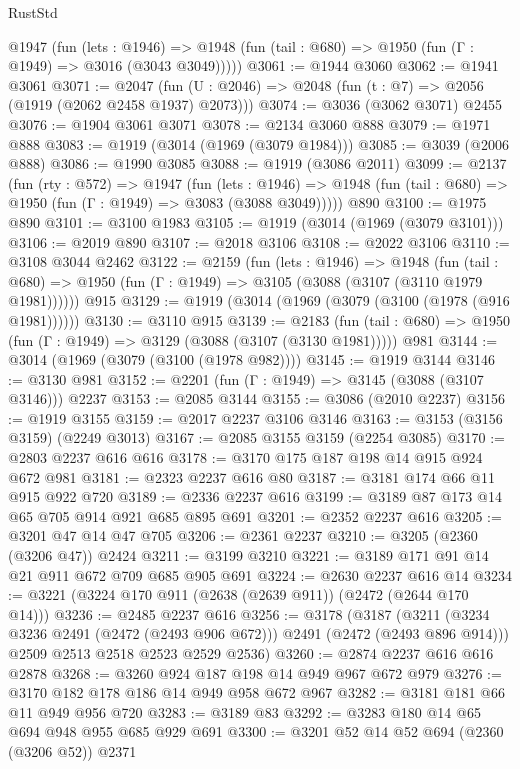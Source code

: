 \begin{lexlean}{RustStd}
\begin{coremodule}
    @1947
      (fun (lets : @1946) =>
      @1948 (fun (tail : @680) => @1950 (fun (Γ : @1949) => @3016 (@3043 @3049)))))
@3061 := @1944 @3060
@3062 := @1941 @3061
@3071 := @2047 (fun (U : @2046) => @2048 (fun (t : @7) => @2056 (@1919 (@2062 @2458 @1937) @2073)))
@3074 := @3036 (@3062 @3071) @2455
@3076 := @1904 @3061 @3071
@3078 := @2134 @3060 @888
@3079 := @1971 @888
@3083 := @1919 (@3014 (@1969 (@3079 @1984)))
@3085 := @3039 (@2006 @888)
@3086 := @1990 @3085
@3088 := @1919 (@3086 @2011)
@3099 := @2137
    (fun (rty : @572) =>
    @1947
      (fun (lets : @1946) =>
      @1948 (fun (tail : @680) => @1950 (fun (Γ : @1949) => @3083 (@3088 @3049)))))
    @890
@3100 := @1975 @890
@3101 := @3100 @1983
@3105 := @1919 (@3014 (@1969 (@3079 @3101)))
@3106 := @2019 @890
@3107 := @2018 @3106
@3108 := @2022 @3106
@3110 := @3108 @3044 @2462
@3122 := @2159
    (fun (lets : @1946) =>
    @1948
      (fun (tail : @680) => @1950 (fun (Γ : @1949) => @3105 (@3088 (@3107 (@3110 @1979 @1981))))))
    @915
@3129 := @1919 (@3014 (@1969 (@3079 (@3100 (@1978 (@916 @1981))))))
@3130 := @3110 @915
@3139 := @2183
    (fun (tail : @680) => @1950 (fun (Γ : @1949) => @3129 (@3088 (@3107 (@3130 @1981)))))
    @981
@3144 := @3014 (@1969 (@3079 (@3100 (@1978 @982))))
@3145 := @1919 @3144
@3146 := @3130 @981
@3152 := @2201 (fun (Γ : @1949) => @3145 (@3088 (@3107 @3146))) @2237
@3153 := @2085 @3144
@3155 := @3086 (@2010 @2237)
@3156 := @1919 @3155
@3159 := @2017 @2237 @3106 @3146
@3163 := @3153 (@3156 @3159) (@2249 @3013)
@3167 := @2085 @3155 @3159 (@2254 @3085)
@3170 := @2803 @2237 @616 @616
@3178 := @3170 @175 @187 @198 @14 @915 @924 @672 @981
@3181 := @2323 @2237 @616 @80
@3187 := @3181 @174 @66 @11 @915 @922 @720
@3189 := @2336 @2237 @616
@3199 := @3189 @87 @173 @14 @65 @705 @914 @921 @685 @895 @691
@3201 := @2352 @2237 @616
@3205 := @3201 @47 @14 @47 @705
@3206 := @2361 @2237
@3210 := @3205 (@2360 (@3206 @47)) @2424
@3211 := @3199 @3210
@3221 := @3189 @171 @91 @14 @21 @911 @672 @709 @685 @905 @691
@3224 := @2630 @2237 @616 @14
@3234 := @3221 (@3224 @170 @911 (@2638 (@2639 @911)) (@2472 (@2644 @170 @14)))
@3236 := @2485 @2237 @616
@3256 := @3178
    (@3187
      (@3211 (@3234 @3236 @2491 (@2472 (@2493 @906 @672))) @2491 (@2472 (@2493 @896 @914)))
      @2509
      @2513
      @2518
      @2523
      @2529
      @2536)
@3260 := @2874 @2237 @616 @616 @2878
@3268 := @3260 @924 @187 @198 @14 @949 @967 @672 @979
@3276 := @3170 @182 @178 @186 @14 @949 @958 @672 @967
@3282 := @3181 @181 @66 @11 @949 @956 @720
@3283 := @3189 @83
@3292 := @3283 @180 @14 @65 @694 @948 @955 @685 @929 @691
@3300 := @3201 @52 @14 @52 @694 (@2360 (@3206 @52)) @2371

\end{coremodule}
\end{lexlean}
